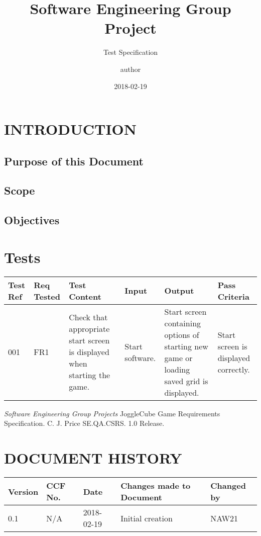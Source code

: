 \documentclass{project}
\begin{document}
\title{Software Engineering Group Project}
\subtitle{Test Specification}
\author{author}     
\date{2018-02-19}
\maketitle
\tableofcontents
\newpage

\section{INTRODUCTION}

\subsection{Purpose of this Document}

\subsection{Scope}

\subsection{Objectives}

\section{Tests}

\begin{tabular}{|p{0.7cm}|p{1cm}|p{3.5cm}|p{3.2cm}|p{3.5cm}|p{3.5cm}|}
\hline
Test Ref & Req Tested & Test Content & Input  & Output & Pass Criteria \\ \hline \hline
001 & FR1 & Check that appropriate start screen is displayed when starting the game. & Start software. & Start screen containing options of starting new game or loading saved grid is displayed. & Start screen is displayed correctly. \\ \hline
\end{tabular}

\clearpage
{}
\begin{thebibliography}{5}
 \emph{Software Engineering Group Projects}
JoggleCube Game Requirements Specification.
C. J. Price SE.QA.CSRS. 1.0 Release.
\end{thebibliography}
\clearpage
{}
\section*{DOCUMENT HISTORY}
\begin{tabular}{|l | l | l | l | l |}
\hline
Version & CCF No. & Date & Changes made to Document & Changed by \\
\hline
0.1 & N/A & 2018-02-19 & Initial creation & NAW21 \\
\hline
\end{tabular}
\label{thelastpage}
\end{document}
